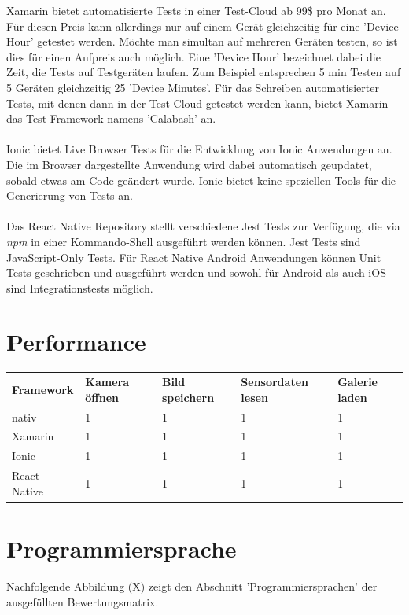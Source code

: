 Xamarin bietet automatisierte Tests in einer Test-Cloud ab 99\$ pro Monat an. Für diesen Preis kann allerdings nur auf einem Gerät gleichzeitig für eine 'Device Hour' getestet werden. Möchte man simultan auf mehreren Geräten testen, so ist dies für einen Aufpreis auch möglich. Eine 'Device Hour' bezeichnet dabei die Zeit, die Tests auf Testgeräten laufen. Zum Beispiel entsprechen 5 min Testen auf 5 Geräten gleichzeitig 25 'Device Minutes'. Für das Schreiben automatisierter Tests, mit denen dann in der Test Cloud getestet werden kann, bietet Xamarin das Test Framework namens 'Calabash' an. 
\\
\\
Ionic bietet Live Browser Tests für die Entwicklung von Ionic Anwendungen an. Die im Browser dargestellte Anwendung wird dabei automatisch geupdatet, sobald etwas am Code geändert wurde. Ionic bietet keine speziellen Tools für die Generierung von Tests an. 
\\
\\
Das React Native Repository stellt verschiedene Jest Tests zur Verfügung, die via \textit{npm} in einer Kommando-Shell ausgeführt werden können. Jest Tests sind JavaScript-Only Tests. Für React Native Android Anwendungen können Unit Tests geschrieben und ausgeführt werden und sowohl für Android als auch iOS sind Integrationstests möglich. 

\section{Performance}

\begin{tabular}{lllll}
\textbf{Framework} & \textbf{Kamera öffnen} & \textbf{Bild speichern} & \textbf{Sensordaten lesen} & \textbf{Galerie laden}\\
nativ & 1 & 1 & 1 & 1\\
Xamarin & 1 & 1 & 1 & 1\\
Ionic & 1 & 1 & 1 & 1\\
React Native & 1 & 1 & 1 & 1\\
\end{tabular}



\section{Programmiersprache}

Nachfolgende Abbildung (X) zeigt den Abschnitt 'Programmiersprachen' der ausgefüllten Bewertungsmatrix.

